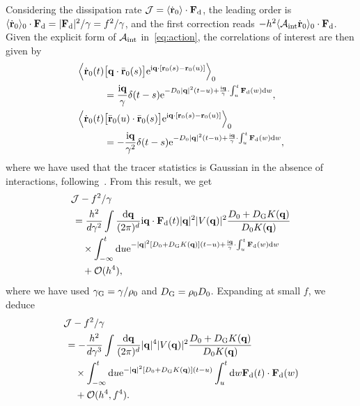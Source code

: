 \documentclass[pre, superscriptaddress, twocolumn,pre]{revtex4-1}
\begin{document}
Considering the dissipation rate ${\cal J}=\langle\dot{\bf r}_0\rangle\cdot{\bf F}_{\rm d}$, the leading order is $\langle\dot{\bf r}_0\rangle_0 \cdot {\bf F}_{\rm d} = |{\bf F}_{\rm d}|^2/\gamma = f^2/\gamma$, and the first correction reads $ - h^2 \langle{\cal A}_{\rm int}\dot{\bf r}_0\rangle_0 \cdot {\bf F}_{\rm d} $. Given the explicit form of ${\cal A}_{\rm int}$ in~\eqref{eq:action}, the correlations of interest are then given by
\begin{equation}
	\begin{aligned}
		\Big\langle\dot{\bf r}_0(t) &\big[{\bf q}\cdot\bar{\bf r}_0(s)\big] {\rm e}^{{\rm i}{\bf q}\cdot[{\bf r}_0(s)-{\bf r}_0(u)]}\Big\rangle_0
		\\
		&= \frac{{\rm i}{\bf q}}{\gamma}\delta(t-s){\rm e}^{ - D_0|{\bf q}|^2(t-u) + \frac{{\rm i}{\bf q}}{\gamma}\cdot\int_u^t {\bf F}_{\rm d}(w) {\rm d}w} ,
		\\
		\Big\langle\dot{\bf r}_0(t) &\big[\bar{\bf r}_0(u)\cdot\bar{\bf r}_0(s)\big] {\rm e}^{{\rm i}{\bf q}\cdot[{\bf r}_0(s)-{\bf r}_0(u)]}\Big\rangle_0
		\\
		&= -\frac{{\rm i}{\bf q}}{\gamma^2}\delta(t-s){\rm e}^{ - D_0|{\bf q}|^2(t-u) + \frac{{\rm i}{\bf q}}{\gamma}\cdot\int_u^t {\bf F}_{\rm d}(w) {\rm d}w} ,
	\end{aligned}
\end{equation}
where we have used that the tracer statistics is Gaussian in the absence of interactions, following~\cite{Demery2011, Demery2014}. From this result, we get
\begin{equation}
	\begin{aligned}
		&{\cal J} - f^2/\gamma
		\\
		&\,= \frac{h^2}{d\gamma^2} \int \frac{{\rm d}{\bf q}}{(2\pi)^d} {\rm i}{\bf q}\cdot{\bf F}_{\rm d}(t) |{\bf q}|^2 |V({\bf q})|^2 \frac{D_0+D_{\rm G}K({\bf q})}{D_0K({\bf q})}
		\\
		&\,\quad\times \int_{-\infty}^t {\rm d}u {\rm e}^{-|{\bf q}|^2 [D_0+D_{\rm G} K({\bf q})](t-u) + \frac{{\rm i}{\bf q}}{\gamma}\cdot\int_u^t{\bf F}_{\rm d}(w){\rm d}w}
		\\
		&\,\quad + {\cal O}(h^4) ,
	\end{aligned}
\end{equation}
where we have used $\gamma_{\rm G}=\gamma/\rho_0$ and $D_{\rm G}=\rho_0D_0$. Expanding at small $f$, we deduce
\begin{equation}
	\begin{aligned}
		&{\cal J} - f^2/\gamma
		\\
		&\,= - \frac{h^2}{d\gamma^3} \int \frac{{\rm d}{\bf q}}{(2\pi)^d} |{\bf q}|^4 |V({\bf q})|^2 \frac{D_0+D_{\rm G}K({\bf q})}{D_0K({\bf q})}
		\\
		&\,\quad\times \int_{-\infty}^t {\rm d}u {\rm e}^{-|{\bf q}|^2 [D_0+D_{\rm G} K({\bf q})](t-u)} \int_u^t{\rm d}w{\bf F}_{\rm d}(t)\cdot{\bf F}_{\rm d}(w)
		\\
		&\,\quad + {\cal O}(h^4,f^4) .
	\end{aligned}
\end{equation}
\end{document}
